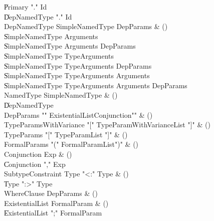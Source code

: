 \begin{bbgrammar}

    \| Primary \xcd"." Id\\
    \| DepNamedType \xcd"." Id\\
 DepNamedType  \label{prod:DepNamedType}  \: SimpleNamedType DepParams & ()\\
    \| SimpleNamedType Arguments\\
    \| SimpleNamedType Arguments DepParams\\
    \| SimpleNamedType TypeArguments\\
    \| SimpleNamedType TypeArguments DepParams\\
    \| SimpleNamedType TypeArguments Arguments\\
    \| SimpleNamedType TypeArguments Arguments DepParams\\
 NamedType  \label{prod:NamedType}  \: SimpleNamedType & ()\\
    \| DepNamedType\\
 DepParams  \label{prod:DepParams}  \: \xcd"{" ExistentialList\opt Conjunction\opt \xcd"}" & ()\\
 TypeParamsWithVariance  \label{prod:TypeParamsWithVariance}  \: \xcd"[" TypeParamWithVarianceList \xcd"]" & ()\\
 TypeParams  \label{prod:TypeParams}  \: \xcd"[" TypeParamList \xcd"]" & ()\\
 FormalParams  \label{prod:FormalParams}  \: \xcd"(" FormalParamList\opt \xcd")" & ()\\
 Conjunction  \label{prod:Conjunction}  \: Exp & ()\\
    \| Conjunction \xcd"," Exp\\
 SubtypeConstraint  \label{prod:SubtypeConstraint}  \: Type  \xcd"<:" Type  & ()\\
    \| Type  \xcd":>" Type \\
 WhereClause  \label{prod:WhereClause}  \: DepParams & ()\\
 ExistentialList  \label{prod:ExistentialList}  \: FormalParam & ()\\
    \| ExistentialList \xcd";" FormalParam\\

\end{bbgrammar}
